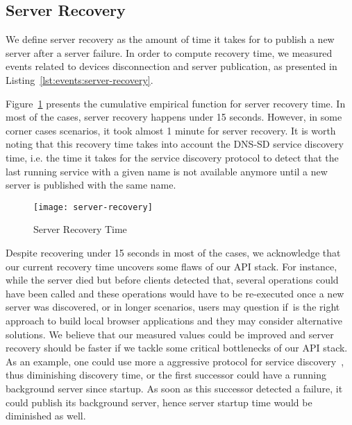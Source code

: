 \subsection{Server Recovery}
\label{sub:eval:server-recovery}

We define server recovery as the amount of time it takes for \APIName to publish a new server after a server failure.
In order to compute recovery time, we measured events related to devices disconnection and server publication, as presented
in Listing~\ref{lst:events:server-recovery}. 


Figure~\ref{fig:server-recovery} presents the cumulative empirical function for server recovery time.
In most of the cases, server recovery happens under 15 seconds. 
However, in some corner cases scenarios, it took almost 1 minute for server recovery. 
It is worth noting that this recovery time takes into account the DNS-SD service discovery time, 
i.e. the time it takes for the service discovery protocol to detect that the last running service with a given name is not available anymore until a new server is published with the same name. 



\begin{figure}
    \centering
    \texttt{[image: server-recovery]}
    \caption{Server Recovery Time}
    \label{fig:server-recovery}
\end{figure}


Despite recovering under 15 seconds in most of the cases,
we acknowledge that our current recovery time uncovers some flaws of our API stack.
For instance, while the server died but before clients detected that, several operations could have been called and these operations would have to be re-executed once a new server was discovered, 
or in longer scenarios, users may question if~\APIName is the right approach to build local browser applications and they may consider alternative solutions.
We believe that our measured values could be improved and server recovery should be faster if we tackle some critical bottlenecks of our API stack.
As an example, one could use more a aggressive protocol for service discovery~\cite{hong2007accelerating}, 
thus diminishing discovery time, or the first successor could have a running background server since startup.
As soon as this successor detected a failure, it could publish its background server, 
hence server startup time would be diminished as well. 
